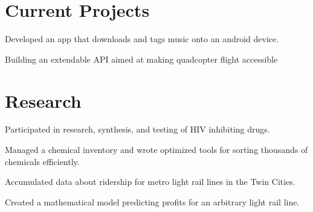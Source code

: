 \documentclass[]{deedy-resume-openfont}
\begin{document}
\begin{minipage}[t]{0.66\textwidth}
\section{Current Projects}

\begin{tightemize}
\item Developed an app that downloads and tags music onto an android device.
\end{tightemize}
\sectionsep

\begin{tightemize}
\item Building an extendable API aimed at making quadcopter flight accessible 
\end{tightemize}
\sectionsep



\section{Research}
\begin{tightemize}
\item Participated in research, synthesis, and testing of HIV inhibiting drugs.
\item Managed a chemical inventory and wrote optimized tools for sorting thousands of chemicals efficiently.
\end{tightemize}
\sectionsep

\begin{tightemize}
\item Accumulated data about ridership for metro light rail lines in the Twin Cities.
\item Created a mathematical model predicting profits for an arbitrary light rail line.
\end{tightemize}
\sectionsep



\end{minipage}
\end{document}
